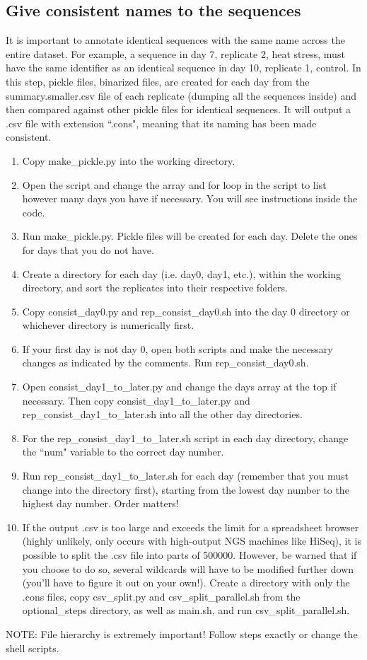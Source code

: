 \documentclass[12pt,titlepage]{article}
\begin{document}
\subsection{Give consistent names to the sequences}
It is important to annotate identical sequences with the same name across the entire dataset. For example, a sequence in day 7, replicate 2, heat stress, must have the same identifier as an identical sequence in day 10, replicate 1, control. In this step, pickle files, binarized files, are created for each day from the summary.smaller.csv file of each replicate (dumping all the sequences inside) and then compared against other pickle files for identical sequences. It will output a .csv file with extension ``.cons", meaning that its naming has been made consistent. 
\begin{enumerate}
\item Copy make\_pickle.py into the working directory. 
\item Open the script and change the array and for loop in the script to list however many days you have if necessary. You will see instructions inside the code. 
\item Run make\_pickle.py. Pickle files will be created for each day. Delete the ones for days that you do not have. 
\item Create a directory for each day (i.e. day0, day1, etc.), within the working directory, and sort the replicates into their respective folders.
\item Copy consist\_day0.py and rep\_consist\_day0.sh into the day 0 directory or whichever directory is numerically first.
\item If your first day is not day 0, open both scripts and make the necessary changes as indicated by the comments. Run rep\_consist\_day0.sh.
\item Open consist\_day1\_to\_later.py and change the days array at the top if necessary. Then copy consist\_day1\_to\_later.py and rep\_consist\_day1\_to\_later.sh into all the other day directories. 
\item For the rep\_consist\_day1\_to\_later.sh script in each day directory, change the ``num" variable to the correct day number.
\item Run rep\_consist\_day1\_to\_later.sh for each day (remember that you must change into the directory first), starting from the lowest day number to the highest day number. Order matters! 
\item If the output .csv is too large and exceeds the limit for a spreadsheet browser (highly unlikely, only occurs with high-output NGS machines like HiSeq), it is possible to split the .csv file into parts of 500000. However, be warned that if you choose to do so, several wildcards will have to be modified further down (you'll have to figure it out on your own!). Create a directory with only the .cons files, copy csv\_split.py and csv\_split\_parallel.sh from the optional\_steps directory, as well as main.sh, and run csv\_split\_parallel.sh.
\end{enumerate}
\noindent NOTE: File hierarchy is extremely important! Follow steps exactly or change the shell scripts. 
\end{document}
